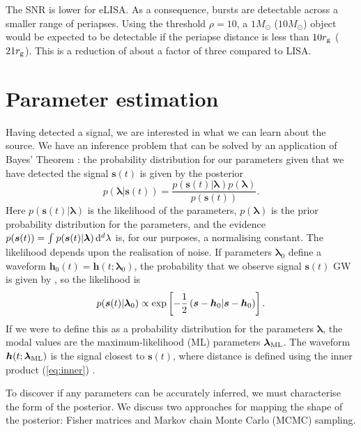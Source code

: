 The SNR is lower for eLISA. As a consequence, bursts are detectable across a smaller range of periapses. Using the threshold $\rho = 10$, a $1 M_\odot$ ($10 M_\odot$) object would be expected to be detectable if the periapse distance is less than $10 r_\mathrm{g}$ ($21 r_\mathrm{g}$). This is a reduction of about a factor of three compared to LISA.

\section{Parameter estimation}\label{sec:Estimation}

Having detected a signal, we are interested in what we can learn about the source. We have an inference problem that can be solved by an application of Bayes' Theorem \citep[chapter 4]{Jaynes2003}: the probability distribution for our parameters given that we have detected the signal $\boldsymbol{s}(t)$ is given by the posterior
\begin{equation}
p(\boldsymbol{\lambda}|\boldsymbol{s}(t)) = \dfrac{p(\boldsymbol{s}(t)|\boldsymbol{\lambda})p(\boldsymbol{\lambda})}{p(\boldsymbol{s}(t))}.
\end{equation}
Here $p(\boldsymbol{s}(t)|\boldsymbol{\lambda})$ is the likelihood of the parameters, $p(\boldsymbol{\lambda})$ is the prior probability distribution for the parameters, and the evidence $p(\boldsymbol{s}(t)) = \int_{}^{}{p(\boldsymbol{s}(t)|\boldsymbol{\lambda})}\,\mathrm{d}{^d \lambda}$ is, for our purposes, a normalising constant. The likelihood depends upon the realisation of noise. If parameters $\boldsymbol{\lambda}_0$ define a waveform $\boldsymbol{h}_0(t) = \boldsymbol{h}(t; \boldsymbol{\lambda}_0)$, the probability that we observe signal $\boldsymbol{s}(t)$ GW is given by , so the likelihood is
\begin{equation}
p(\boldsymbol{s}(t)|\boldsymbol{\lambda}_0) \propto \exp\left[-\dfrac{1}{2}\left({\boldsymbol{s}-\boldsymbol{h}_0}\middle|{\boldsymbol{s}-\boldsymbol{h}_0}\right)\right].
\label{eq:likelihood}
\end{equation}
If we were to define this as a probability distribution for the parameters $\boldsymbol{\lambda}$, the modal values are the maximum-likelihood (ML) parameters $\boldsymbol{\lambda}_\mathrm{ML}$. The waveform $\boldsymbol{h}(t; \boldsymbol{\lambda}_\mathrm{ML})$ is the signal closest to $\boldsymbol{s}(t)$, where distance is defined using the inner product (\ref{eq:inner}) \citep{Cutler1994}.

To discover if any parameters can be accurately inferred, we must characterise the form of the posterior. We discuss two approaches for mapping the shape of the posterior: Fisher matrices and Markov chain Monte Carlo (MCMC) sampling.

